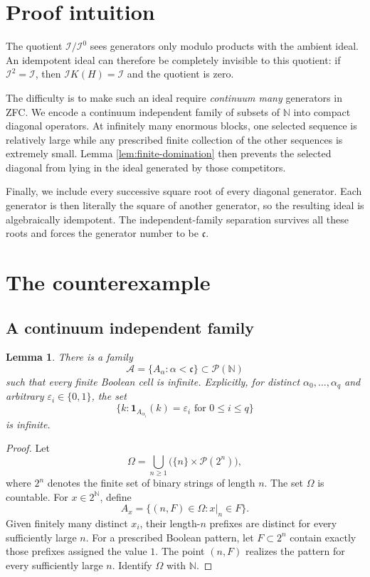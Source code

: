 \documentclass[11pt]{article}
\newtheorem{lemma}[theorem]{Lemma}
\newcommand{\KH}{K(H)}
\newcommand{\cc}{\mathfrak c}
\begin{document}
\section{Proof intuition}

The quotient \(\mathcal I/\mathcal I^0\) sees generators only modulo products
with the ambient ideal.  An idempotent ideal can therefore be completely
invisible to this quotient: if \(\mathcal I^2=\mathcal I\), then
\(\mathcal I\KH=\mathcal I\) and the quotient is zero.

The difficulty is to make such an ideal require \emph{continuum many}
generators in ZFC.  We encode a continuum independent family of subsets of
\(\mathbb N\) into compact diagonal operators.  At infinitely many enormous
blocks, one selected sequence is relatively large while any prescribed
finite collection of the other sequences is extremely small.  Lemma
\ref{lem:finite-domination} then prevents the selected diagonal from lying in
the ideal generated by those competitors.

Finally, we include every successive square root of every diagonal generator.
Each generator is then literally the square of another generator, so the
resulting ideal is algebraically idempotent.  The independent-family
separation survives all these roots and forces the generator number to be
\(\cc\).

\section{The counterexample}

\subsection{A continuum independent family}

\begin{lemma}\label{lem:independent}
There is a family
\[
       \mathscr A=\{A_\alpha:\alpha<\cc\}\subset\mathcal P(\mathbb N)
\]
such that every finite Boolean cell is infinite.  Explicitly, for distinct
\(\alpha_0,\ldots,\alpha_q\) and arbitrary
\(\varepsilon_i\in\{0,1\}\), the set
\[
 \{k:\mathbf 1_{A_{\alpha_i}}(k)=\varepsilon_i
          \text{ for }0\leq i\leq q\}
\]
is infinite.
\end{lemma}

\begin{proof}
Let
\[
 \Omega=\bigcup_{n\geq1}\bigl(\{n\}\times\mathcal P(2^n)\bigr),
\]
where \(2^n\) denotes the finite set of binary strings of length \(n\).
The set \(\Omega\) is countable.  For \(x\in2^{\mathbb N}\), define
\[
 A_x=\{(n,F)\in\Omega:x|_n\in F\}.
\]
Given finitely many distinct \(x_i\), their length-\(n\) prefixes are
distinct for every sufficiently large \(n\).  For a prescribed Boolean
pattern, let \(F\subset2^n\) contain exactly those prefixes assigned the
value \(1\).  The point \((n,F)\) realizes the pattern for every sufficiently
large \(n\).  Identify \(\Omega\) with \(\mathbb N\).
\end{proof}
\end{document}
